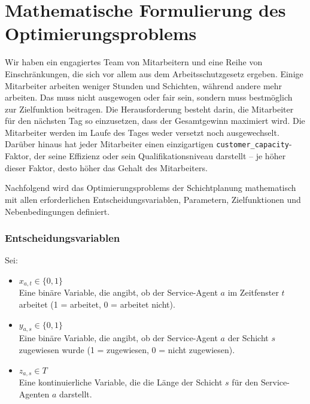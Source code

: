 
\chapter{Mathematische Formulierung des Optimierungsproblems}
Wir haben ein engagiertes Team von Mitarbeitern und eine Reihe von Einschränkungen, die sich vor allem aus dem Arbeitsschutzgesetz ergeben. Einige Mitarbeiter arbeiten weniger Stunden und Schichten, während andere mehr arbeiten. Das muss nicht ausgewogen oder fair sein, sondern muss bestmöglich zur Zielfunktion beitragen. Die Herausforderung besteht darin, die Mitarbeiter für den nächsten Tag so einzusetzen, dass der Gesamtgewinn maximiert wird. Die Mitarbeiter werden im Laufe des Tages weder versetzt noch ausgewechselt. Darüber hinaus hat jeder Mitarbeiter einen einzigartigen \texttt{customer_capacity}-Faktor, der seine Effizienz oder sein Qualifikationsniveau darstellt -- je höher dieser Faktor, desto höher das Gehalt des Mitarbeiters.

Nachfolgend wird das Optimierungsproblems der Schichtplanung mathematisch mit allen erforderlichen Entscheidungsvariablen, Parametern, Zielfunktionen und Nebenbedingungen definiert.

\subsection*{Entscheidungsvariablen}
Sei:
\begin{itemize}
    \item $ x_{a,t} \in \{0, 1\} $\\
          Eine binäre Variable, die angibt, ob der Service-Agent $ a $ im Zeitfenster $ t $ arbeitet (1 = arbeitet, 0 = arbeitet nicht).
    \item $ y_{a,s} \in \{0, 1\} $\\
          Eine binäre Variable, die angibt, ob der Service-Agent $ a $ der Schicht $ s $ zugewiesen wurde (1 = zugewiesen, 0 = nicht zugewiesen).
    \item $ z_{a,s} \in T $\\
          Eine kontinuierliche Variable, die die Länge der Schicht $ s $ für den Service-Agenten $ a $ darstellt.
\end{itemize}

